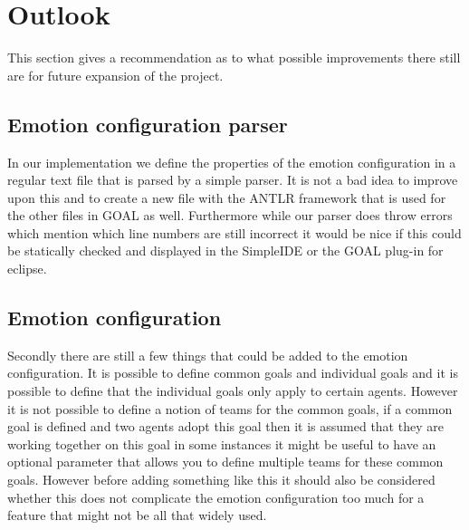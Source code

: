 \documentclass[11pt]{article}
\begin{document}
\section{Outlook}
This section gives a recommendation as to what possible improvements there still are for future expansion of the project.

\subsection{Emotion configuration parser}
In our implementation we define the properties of the emotion configuration in a regular text file that is parsed by a simple parser. It is not a bad idea to improve upon this and to create a new file with the ANTLR framework that is used for the other files in GOAL as well. Furthermore while our parser does throw errors which mention which line numbers are still incorrect it would be nice if this could be statically checked and displayed in the SimpleIDE or the GOAL plug-in for eclipse.

\subsection{Emotion configuration}
Secondly there are still a few things that could be added to the emotion configuration. It is possible to define common goals and individual goals and it is possible to define that the individual goals only apply to certain agents. However it is not possible to define a notion of teams for the common goals, if a common goal is defined and two agents adopt this goal then it is assumed that they are working together on this goal in some instances it might be useful to have an optional parameter that allows you to define multiple teams for these common goals. However before adding something like this it should also be considered whether this does not complicate the emotion configuration too much for a feature that might not be all that widely used.
\end{document}
